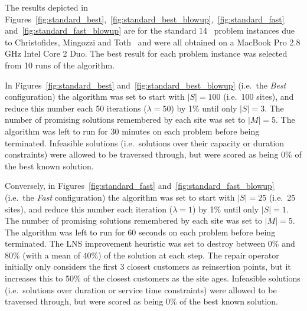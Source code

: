 



The results depicted in Figures~\ref{fig:standard_best},~\ref{fig:standard_best_blowup},~\ref{fig:standard_fast} and~\ref{fig:standard_fast_blowup} are for the standard 14 \VRP\ problem instances due to Christofides, Mingozzi and Toth~\cite{CMT:1981} and were all obtained on a MacBook Pro 2.8 GHz Intel Core 2 Duo. The best result for each problem instance was selected from 10 runs of the algorithm. 

In Figures~\ref{fig:standard_best} and~\ref{fig:standard_best_blowup} (i.e.~the \emph{Best} configuration) the algorithm was set to start with $|S| = 100$ (i.e.~100 sites), and reduce this number each 50 iterations ($\lambda = 50$) by 1\% until only $|S| = 3$. The number of promising solutions remembered by each site was set to $|M| = 5$. The algorithm was left to run for 30 minutes on each problem before being terminated. Infeasible solutions (i.e.~solutions over their capacity or duration constraints) were allowed to be traversed through, but were scored as being 0\% of the best known solution.

Conversely, in Figures~\ref{fig:standard_fast} and~\ref{fig:standard_fast_blowup} (i.e.~the \emph{Fast} configuration) the algorithm was set to start with $|S| = 25$ (i.e.~25 sites), and reduce this number each iteration ($\lambda = 1$) by 1\% until only $|S| = 1$. The number of promising solutions remembered by each site was set to $|M| = 5$. The algorithm was left to run for 60 seconds on each problem before being terminated. The LNS improvement heuristic was set to destroy between 0\% and 80\% (with a mean of 40\%) of the solution at each step. The repair operator initially only considers the first 3 closest customers as reinsertion points, but it increases this to 50\% of the closest customers as the site ages. Infeasible solutions (i.e.~solutions over duration or service time constraints) were allowed to be traversed through, but were scored as being 0\% of the best known solution.

